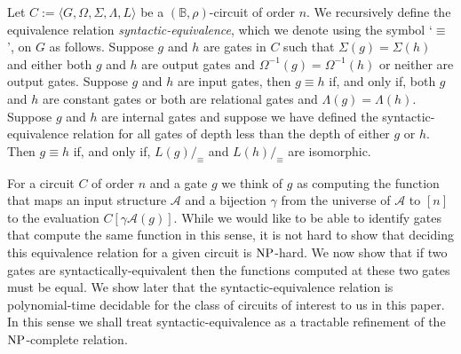 \documentclass[../main/thesis.tex]{subfiles}
\begin{document}
\begin{definition}
  Let $C := \langle G, \Omega, \Sigma, \Lambda, L \rangle$ be a $(\mathbb{B},
  \rho)$-circuit of order $n$. We recursively define the equivalence relation
  \emph{syntactic-equivalence}, which we denote using the symbol `$\equiv$', on
  $G$ as follows. Suppose $g$ and $h$ are gates in $C$ such that $\Sigma (g) =
  \Sigma(h)$ and either both $g$ and $h$ are output gates and $\Omega^{-1}(g) =
  \Omega^{-1}(h)$ or neither are output gates. Suppose $g$ and $h$ are input
  gates, then $g \equiv h$ if, and only if, both $g$ and $h$ are constant gates
  or both are relational gates and $\Lambda(g) = \Lambda (h)$. Suppose $g$ and
  $h$ are internal gates and suppose we have defined the syntactic-equivalence
  relation for all gates of depth less than the depth of either $g$ or $h$. Then
  $g \equiv h$ if, and only if, $L(g) /_\equiv$ and $L(h) /_\equiv$ are
  isomorphic.
\end{definition}

For a circuit $C$ of order $n$ and a gate $g$ we think of $g$ as computing the
function that maps an input structure $\mathcal{A}$ and a bijection $\gamma$
from the universe of $\mathcal{A}$ to $[n]$ to the evaluation $C[\gamma
\mathcal{A}(g)]$. While we would like to be able to identify gates that compute
the same function in this sense, it is not hard to show that deciding this
equivalence relation for a given circuit is $\mathrm{NP}$-hard. We now show that if two
gates are syntactically-equivalent then the functions computed at these two
gates must be equal. We show later that the syntactic-equivalence relation is
polynomial-time decidable for the class of circuits of interest to us in this
paper. In this sense we shall treat syntactic-equivalence as a tractable
refinement of the $\mathrm{NP}$-complete relation.
\end{document}
